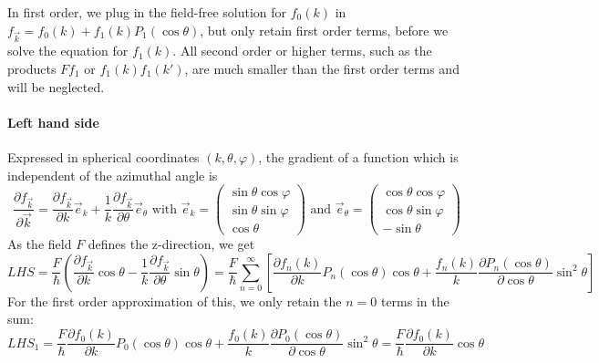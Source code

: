 \documentclass[physics,phd,nolot,nolof]{uccthesis}%
\begin{document}
{In first order, we plug in the field-free solution for $f_0(k)$ in $f_{\vec k} = f_0(k) + f_1(k) P_1(\cos\theta)$, but only retain first order terms,
before we solve the equation for $f_1(k)$. 
All second order or higher terms, such as the products $F f_1$ or $f_1(k) f_1(k')$, are much smaller than the first order terms and will be neglected.

\paragraph*{Left hand side}
Expressed in spherical coordinates $(k,\theta,\varphi)$, the gradient of a function which is independent of the azimuthal angle is 
\[
  \frac{\partial f_{\vec k}}{\partial \vec k} = 
  \frac{\partial f_{\vec k}}{\partial k} \vec e_k + 
  \frac{1}{k}  \frac{\partial f_{\vec k}}{\partial \theta } \vec e_\theta  
  \text{ with }
  \vec e_k =	\begin{pmatrix}
    			\sin\theta\cos\varphi\\
    			\sin\theta\sin\varphi\\
    			\cos\theta
		\end{pmatrix}
  \text{ and }
  \vec e_\theta =\begin{pmatrix}
    			\cos\theta\cos\varphi\\
    			\cos\theta\sin\varphi\\
    			-\sin\theta
		\end{pmatrix}
\]
As the field $F$ defines the z-direction, we get 
\begin{equation}
  LHS = 
  \frac{F}{\hbar}  \left( \frac{\partial f_{\vec k}}{\partial k} \cos\theta
  -\frac{1}{k}  \frac{\partial f_{\vec k}}{\partial \theta } \sin\theta  \right)
  = \frac{F}{\hbar} \sum_{n=0}^\infty
  \left[
  \frac{\partial f_n(k)}{\partial k} P_n(\cos\theta)\cos\theta
  +\frac{f_n(k)}{k} \frac{\partial P_n(\cos\theta) }{\partial \cos\theta} \sin^2\theta 
  \right]
  \label{eq-Boltzmann-LHS}
\end{equation}
For the first order approximation of this, we only retain the $n=0$ terms in the sum:
\begin{equation}
  LHS_1  
  = \frac{F}{\hbar} 
  \frac{\partial f_0(k)}{\partial k} P_0(\cos\theta)\cos\theta
  +\frac{f_0(k)}{k} \frac{\partial P_0(\cos\theta) }{\partial \cos\theta} \sin^2\theta 
  = \frac{F}{\hbar} 
  \frac{\partial f_0(k)}{\partial k}\cos\theta
  \label{eq-Boltzmann-LHS-1}
\end{equation}
}
\end{document}
